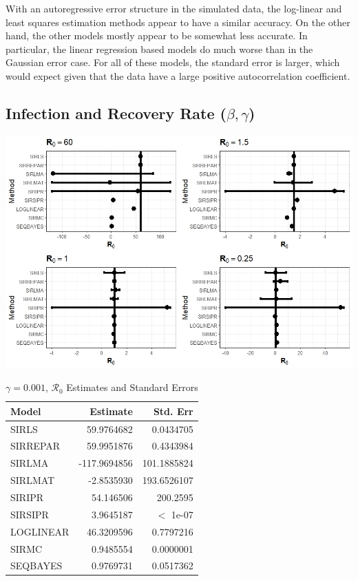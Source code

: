 \message{ !name(draft_v13.tex)}\documentclass[12pt]{article}
\newcommand{\rr}{\ensuremath{\mathcal{R}_0}}
\begin{document}
With an autoregressive error structure in the simulated data, the log-linear and least squares estimation methods appear to have a similar accuracy. On the other hand, the other models mostly appear to be somewhat less accurate. In particular, the linear regression based models do much worse than in the Gaussian error case. For all of these models, the standard error is larger, which would expect given that the data have a large positive autocorrelation coefficient.


\subsection{Infection and Recovery Rate ($\beta, \gamma$)}\label{sec:res-beta-gamma}

\includegraphics[scale=0.5]{images/parchange.jpeg}

\begin{table}[H]
	
	\caption{\label{tab:}$\gamma = 0.001$, $\rr$ Estimates and Standard Errors}
	\centering
	\begin{tabular}[t]{l|r|r}
		\hline
		Model & Estimate & Std. Err\\
		\hline
		SIRLS & 59.9764682 & 0.0434705\\
		\hline
		SIRREPAR & 59.9951876 & 0.4343984\\
		\hline
		SIRLMA &  -117.9694856 & 101.1885824\\
		\hline
		SIRLMAT & -2.8535930 & 193.6526107 \\
		\hline
		SIRIPR & 54.146506 & 200.2595\\
		\hline
		SIRSIPR & 3.9645187 & $<$ 1e-07\\
		\hline
		LOGLINEAR & 46.3209596 & 0.7797216\\
		\hline
		SIRMC & 0.9485554 & 0.0000001\\
		\hline
		SEQBAYES & 0.9769731 & 0.0517362\\
		\hline
	\end{tabular}
\end{table}
\end{document}
